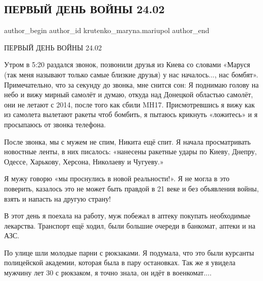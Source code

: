  
 
 
 
 

\subsection{ПЕРВЫЙ ДЕНЬ ВОЙНЫ 24.02}
\label{sec:24_02_2023.fb.krutenko_maryna.mariupol.1.pervii_den_voini_24_}

\ifcmt
 author_begin
   author_id krutenko_maryna.mariupol
 author_end
\fi

ПЕРВЫЙ ДЕНЬ ВОЙНЫ 24.02

Утром в 5:20 раздался звонок, позвонили друзья из Киева со словами «Маруся (так
меня называют только самые близкие друзья) у нас началось..., нас бомбят».
Примечательно, что за секунду до звонка, мне снится сон: Я поднимаю голову на
небо и вижу мирный самолёт и думаю, откуда над Донецкой областью самолёт, они
не летают с 2014, после того как сбили MH17. Присмотревшись я вижу как из
самолета вылетают ракеты чтоб бомбить, я пытаюсь крикнуть «ложитесь» и я
просыпаюсь от звонка телефона. 

После звонка, мы с мужем не спим, Никита ещё спит. Я начала просматривать
новостные ленты, в них писалось: «нанесены ракетные удары по Киеву, Днепру,
Одессе, Харькову, Херсона, Николаеву и Чугуеву.» 

Я мужу говорю «мы проснулись в новой реальности!». Я не могла в это поверить,
казалось это не может быть правдой в 21 веке и без объявления войны, взять и
напасть на другую страну!

В этот день я поехала на работу, муж побежал в аптеку покупать необходимые
лекарства. Транспорт ещё ходил, были большие очереди в банкомат, аптеки и на
АЗС. 

По улице шли молодые парни с рюкзаками. Я подумала, что это были курсанты
полицейской академии, которая была в пару остановках. Так же я увидела мужчину
лет 30 с рюкзаком, я точно знала, он идёт в военкомат....

